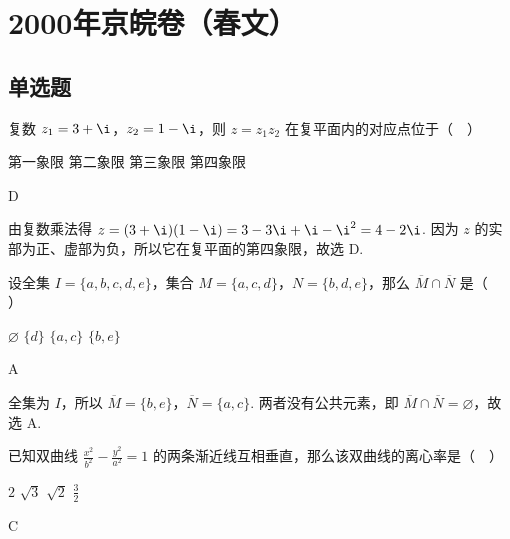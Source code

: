 \chapter{2000年京皖卷（春文）}

\section{单选题}

\begin{problem}
复数 \(z_1=3+\i\)，\(z_2=1-\i\)，则 \(z=z_1z_2\) 在复平面内的对应点位于（\(\quad\)）

\choices
    {第一象限}
    {第二象限}
    {第三象限}
    {第四象限}
\end{problem}

\begin{answer}
D
\end{answer}

\begin{solution}
由复数乘法得 \(z=(3+\i)(1-\i)=3-3\i+\i-\i^2=4-2\i\). 因为 \(z\) 的实部为正、虚部为负，所以它在复平面的第四象限，故选 D.
\end{solution}

\begin{problem}
设全集 \(I=\{a,b,c,d,e\}\)，集合 \(M=\{a,c,d\}\)，\(N=\{b,d,e\}\)，那么 \(\overline{M}\cap\overline{N}\) 是（\(\quad\)）

\choices
    {\(\varnothing\)}
    {\(\{d\}\)}
    {\(\{a,c\}\)}
    {\(\{b,e\}\)}
\end{problem}

\begin{answer}
A
\end{answer}

\begin{solution}
全集为 \(I\)，所以 \(\overline{M}=\{b,e\}\)，\(\overline{N}=\{a,c\}\). 两者没有公共元素，即 \(\overline{M}\cap\overline{N}=\varnothing\)，故选 A.
\end{solution}

\begin{problem}
已知双曲线 \(\frac{x^2}{b^2} - \frac{y^2}{a^2} = 1\) 的两条渐近线互相垂直，那么该双曲线的离心率是（\(\quad\)）

\choices
    {\(2\)}
    {\(\sqrt{3}\)}
    {\(\sqrt{2}\)}
    {\(\frac{3}{2}\)}
\end{problem}

\begin{answer}
C
\end{answer}


